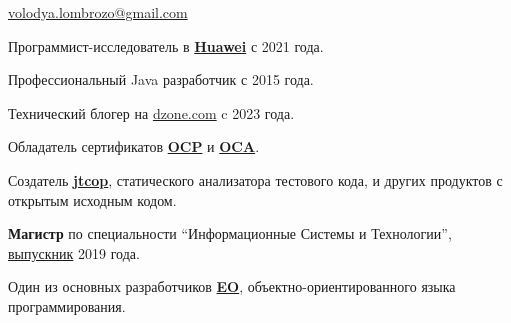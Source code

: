 \documentclass{vl}
\begin{document}
    \vlPrintPhoto{}

    {\bfseries\Large {}}\newline
    \href{mailto:volodya.lombrozo@gmail.com}{volodya.lombrozo@gmail.com}

    \vspace{1em}

    Программист-исследователь в \textbf{\href{https://www.huawei.com}{Huawei}} с 2021 года.

    Профессиональный Java разработчик с 2015 года.

    Технический блогер на \href{https://dzone.com/users/4993224/volodya-lombrozo.html}{dzone.com} c 2023 года.

    Обладатель сертификатов
    \textbf{\href{https://catalog-education.oracle.com/pls/certview/sharebadge?id=87F6A2FE819A5A5AF4120A05900AB28A461EE9A3EE9FBFA02721FADAEB3BCE19}{OCP}}%
    и
    \textbf{\href{https://www.credly.com/badges/e2d9ddda-20dc-433d-8ab7-18548fd0fd8f/public_url}{OCA}}.

    Создатель \textbf{\href{https://github.com/volodya-lombrozo/jtcop}{jtcop}}, статического анализатора тестового кода,
    и других продуктов с открытым исходным кодом.


    \textbf{Магистр} по специальности ``Информационные Системы и Технологии'',
    \href{https://en.wikipedia.org/wiki/Saint_Petersburg_Electrotechnical_University}{выпускник} 2019 года.

    Один из основных разработчиков \textbf{\href{https://www.eolang.org}{EO}}, объектно-ориентированного языка программирования.
\end{document}
